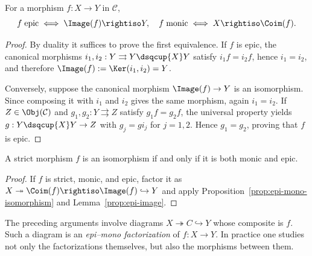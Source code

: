 \begin{lemma}\label{prop:epi-image}
	For a morphism $f:X\to Y$ in $\mathcal C$,
	\[ f\;\text{epic} \iff \Image(f) \rightiso Y, \quad
	   f\;\text{monic} \iff X \rightiso \Coim(f). \]
\end{lemma}

\begin{proof}
	By duality it suffices to prove the first equivalence. If $f$ is epic, the canonical morphisms $i_1,i_2:Y\rightrightarrows Y\dsqcup{X}Y$ satisfy $i_1f=i_2f$, hence $i_1=i_2$, and therefore $\Image(f):=\Ker(i_1,i_2)=Y$.

	Conversely, suppose the canonical morphism $\Image(f)\to Y$ is an isomorphism. Since composing it with $i_1$ and $i_2$ gives the same morphism, again $i_1=i_2$. If $Z\in\Obj(\mathcal C)$ and $g_1,g_2:Y\rightrightarrows Z$ satisfy $g_1f=g_2f$, the universal property yields $g:Y\dsqcup{X}Y\to Z$ with $g_j=gi_j$ for $j=1,2$. Hence $g_1=g_2$, proving that $f$ is epic.
\end{proof}

\begin{proposition}\label{prop:strict-isomorphism}
	A strict morphism $f$ is an isomorphism if and only if it is both monic and epic.
\end{proposition}

\begin{proof}
	If $f$ is strict, monic, and epic, factor it as $X\twoheadrightarrow\Coim(f)\rightiso\Image(f)\hookrightarrow Y$ and apply Proposition~\ref{prop:epi-mono-isomorphism} and Lemma~\ref{prop:epi-image}.
\end{proof}

The preceding arguments involve diagrams $X\twoheadrightarrow C\hookrightarrow Y$ whose composite is $f$. Such a diagram is an \emph{epi--mono factorization} of $f:X\to Y$. In practice one studies not only the factorizations themselves, but also the morphisms between them.

